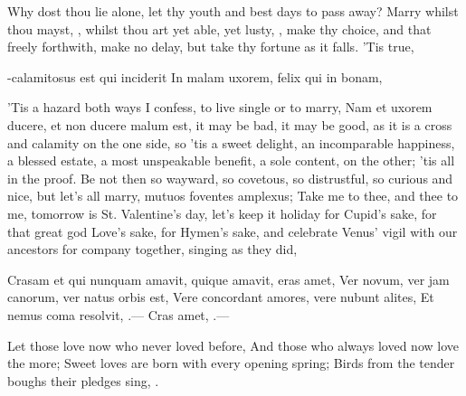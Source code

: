 Why dost thou lie alone, let thy youth and best days to pass away?
Marry whilst thou mayst, , whilst
thou art yet able, yet lusty, , make thy choice, and that freely forthwith, make no delay, but
take thy fortune as it falls. 'Tis true,

-calamitosus est qui inciderit
In malam uxorem, felix qui in bonam,

'Tis a hazard both ways I confess, to live single or to marry,
Nam et uxorem ducere, et non ducere malum est, it may be bad, it
may be good, as it is a cross and calamity on the one side, so 'tis a
sweet delight, an incomparable happiness, a blessed estate, a most
unspeakable benefit, a sole content, on the other; 'tis all in the
proof. Be not then so wayward, so covetous, so distrustful, so curious
and nice, but let's all marry, mutuos foventes amplexus; Take me to
thee, and thee to me, tomorrow is St. Valentine's day, let's keep it
holiday for Cupid's sake, for that great god Love's sake, for Hymen's
sake, and celebrate Venus' vigil with our ancestors for company
together, singing as they did,

Crasam et qui nunquam amavit, quique amavit, eras amet,
Ver novum, ver jam canorum, ver natus orbis est,
Vere concordant amores, vere nubunt alites,
Et nemus coma resolvit, \etc{}.---
Cras amet, \etc{}.---

Let those love now who never loved before,
And those who always loved now love the more;
Sweet loves are born with every opening spring;
Birds from the tender boughs their pledges sing, \etc{}.


